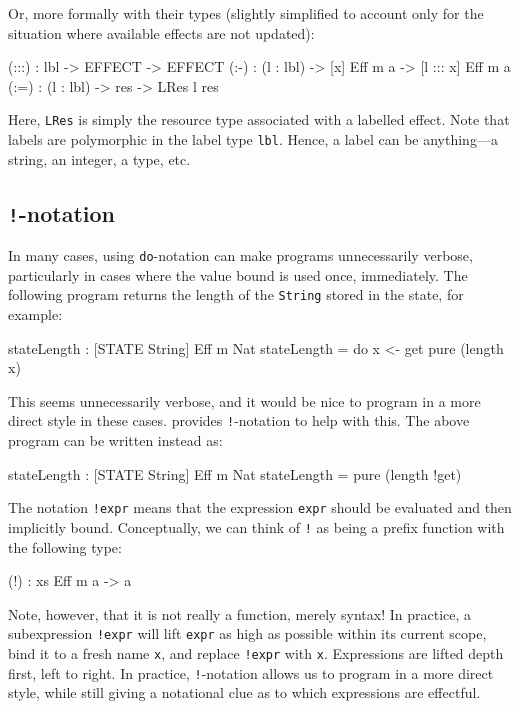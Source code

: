 \noindent
Or, more formally with their types (slightly simplified to account only for
the situation where available effects are not updated):

\begin{code}
(:::) : lbl -> EFFECT -> EFFECT
(:-)  : (l : lbl) -> { [x] } Eff m a -> { [l ::: x] } Eff m a
(:=)  : (l : lbl) -> res -> LRes l res
\end{code}

\noindent
Here, \texttt{LRes} is simply the resource type associated with a labelled
effect. Note that labels are polymorphic in the label type \texttt{lbl}. 
Hence, a label can be anything---a string, an integer, a type, etc.

\subsection{\texttt{!}-notation}

In many cases, using \texttt{do}-notation can make programs unnecessarily
verbose, particularly in cases where the value
bound is used once, immediately. The following program returns the length of
the \texttt{String} stored in the state, for example:

\begin{code}
stateLength : { [STATE String] } Eff m Nat
stateLength = do x <- get
                 pure (length x)
\end{code}

\noindent
This seems unnecessarily verbose, and it would be nice to program in a more
direct style in these cases. \Idris{} provides \texttt{!}-notation to help
with this. The above program can be written instead as:

\begin{code}
stateLength : { [STATE String] } Eff m Nat
stateLength = pure (length !get)
\end{code}

\noindent
The notation \texttt{!expr} means that the expression \texttt{expr} should
be evaluated and then implicitly bound. Conceptually,
we can think of \texttt{!} as being a prefix function with the following type:

\begin{code}
(!) : { xs } Eff m a -> a
\end{code}

\noindent
Note, however, that it is not really a function, merely syntax! In practice, a
subexpression \texttt{!expr} will lift \texttt{expr} as high as possible within
its current scope, bind it to a fresh name \texttt{x}, and replace
\texttt{!expr} with \texttt{x}. Expressions are lifted depth first, left to
right. In practice, \texttt{!}-notation allows us to program in a more direct
style, while still giving a notational clue as to which expressions are
effectful.

